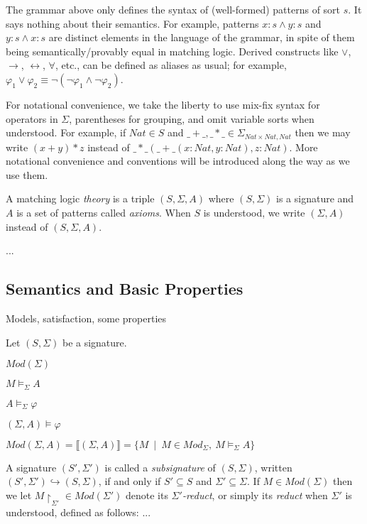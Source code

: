 \documentclass[UTF8,11pt]{article}
\theoremstyle{plain}
\theoremstyle{definition}
\theoremstyle{remark}
\newcommand{\cln}{{:}}
\newcommand{\Nat}{\textit{Nat}}
\newcommand{\Mod}{\textit{Mod}}
\newcommand{\denote}[1]{\llbracket{#1}\rrbracket}
\newcommand{\reduct}[2]{\mbox{${#1}\!\!\upharpoonright_{#2}$}}
\begin{document}
The grammar above only defines the syntax of (well-formed) patterns of sort
$s$.
It says nothing about their semantics.
For example, patterns $x\cln s \wedge y \cln s$ and
$y\cln s \wedge x \cln s$ are distinct elements in the language
of the grammar, in spite of them being semantically/provably equal
in matching logic.
Derived constructs like $\vee$, $\rightarrow$, $\leftrightarrow$,
$\forall$, etc., can be defined as aliases as usual; for example,
$\varphi_1 \vee \varphi_2 \equiv \neg(\neg \varphi_1 \wedge \neg\varphi_2)$.

For notational convenience, we take the liberty to use mix-fix syntax for
operators in $\Sigma$,
parentheses for grouping, and omit variable sorts when understood.
For example, if $\Nat \in S$ and
$\_+\_, \_*\_ \in \Sigma_{\Nat \times \Nat, \Nat}$
then we may write $(x + y)*z$ instead of
$\_*\_(\_+\_(x\cln\Nat,y\cln\Nat),z\cln\Nat)$.
More notational convenience and conventions will be introduced along the way
as we use them. 

A matching logic \emph{theory} is a triple $(S, \Sigma, A)$ where
$(S,\Sigma)$ is a signature and $A$ is a set of patterns called \emph{axioms}.
When $S$ is understood, we write $(\Sigma,A)$ instead of $(S,\Sigma,A)$.

...

\subsection{Semantics and Basic Properties}
\label{sec:semantics}

Models, satisfaction, some properties

Let $(S,\Sigma)$ be a signature.

$\Mod(\Sigma)$

$M \models_{\Sigma} A$

$A \models_\Sigma \varphi$

$(\Sigma,A) \models \varphi$

$\Mod(\Sigma,A) =
\denote{(\Sigma,A)} =
\{M \ \mid \ M \in \Mod_{\Sigma},\ M \models_{\Sigma} A \}$

A signature $(S',\Sigma')$ is called a \emph{subsignature} of $(S,\Sigma)$, written
$(S',\Sigma') \hookrightarrow(S,\Sigma)$, if and only if $S' \subseteq S$ and
$\Sigma' \subseteq \Sigma$.
If $M \in \Mod(\Sigma)$ then we let
$\reduct{M}{\Sigma'} \in \Mod(\Sigma')$ denote its
\emph{$\Sigma'$-reduct}, or simply its \emph{reduct} when
$\Sigma'$ is understood, defined as follows: ...
\end{document}
